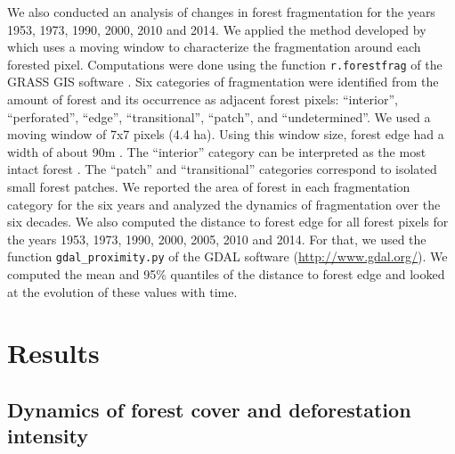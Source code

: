 \documentclass[a4paper, 12pt, leqno]{article} %
\begin{document}
We also conducted an analysis of changes in forest fragmentation for
the years 1953, 1973, 1990, 2000, 2010 and 2014. We applied the method
developed by \citet{Riitters2000} which uses a moving window to
characterize the fragmentation around each forested
pixel. Computations were done using the function \texttt{r.forestfrag}
of the GRASS GIS software \citep{Neteler2008}. Six categories of
fragmentation were identified from the amount of forest and its
occurrence as adjacent forest pixels: ``interior'', ``perforated'',
``edge'', ``transitional'', ``patch'', and ``undetermined''. We used a
moving window of 7x7 pixels (4.4 ha). Using this window size, forest
edge had a width of about 90m \citep{Riitters2000}. The ``interior''
category can be interpreted as the most intact forest
\citep{Potapov2017}. The ``patch'' and ``transitional'' categories
correspond to isolated small forest patches.  We reported the area of
forest in each fragmentation category for the six years and analyzed
the dynamics of fragmentation over the six decades. We also computed
the distance to forest edge for all forest pixels for the years 1953,
1973, 1990, 2000, 2005, 2010 and 2014. For that, we used the function
\texttt{gdal\_proximity.py} of the GDAL software
(\url{http://www.gdal.org/}). We computed the mean and 95\% quantiles
of the distance to forest edge and looked at the evolution of these
values with time.

\section{Results}
\label{results}

\subsection{Dynamics of forest cover and deforestation
intensity}
\end{document}
